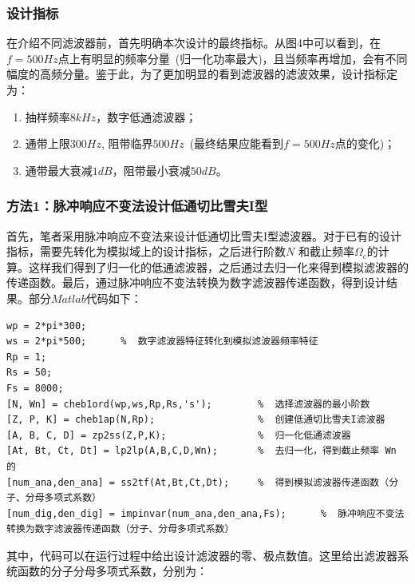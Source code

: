 \documentclass[a4paper,11pt,onecolumn,twoside]{article}
\begin{document}
\subsubsection{设计指标}
在介绍不同滤波器前，首先明确本次设计的最终指标。从图4中可以看到，在$f=500Hz$点上有明显的频率分量~(归一化功率最大)，且当频率再增加，会有不同幅度的高频分量。鉴于此，为了更加明显的看到滤波器的滤波效果，设计指标定为：
\begin{enumerate}
\item 抽样频率$8kHz$，数字低通滤波器；
\item 通带上限$300Hz$, 阻带临界$500Hz$~(最终结果应能看到$f=500Hz$点的变化)；
\item 通带最大衰减$1dB$，阻带最小衰减$50dB$。
\end{enumerate}

\subsubsection{方法1：脉冲响应不变法设计低通切比雪夫I型}
首先，笔者采用脉冲响应不变法来设计低通切比雪夫I型滤波器。对于已有的设计指标，需要先转化为模拟域上的设计指标，之后进行阶数$N$ 和截止频率$\Omega_c$的计算。这样我们得到了归一化的低通滤波器，之后通过去归一化来得到模拟滤波器的传递函数。最后，通过脉冲响应不变法转换为数字滤波器传递函数，得到设计结果。部分$Matlab$代码如下：

\begin{lstlisting}[style=Matlab-editor,
                   basicstyle=\mlttfamily,
                   caption={Designing IIR Filter Code}, label=code1]
wp = 2*pi*300;
ws = 2*pi*500;      %  数字滤波器特征转化到模拟滤波器频率特征
Rp = 1;
Rs = 50;
Fs = 8000;
[N, Wn] = cheb1ord(wp,ws,Rp,Rs,'s');        %  选择滤波器的最小阶数
[Z, P, K] = cheb1ap(N,Rp);                  %  创建低通切比雪夫I滤波器
[A, B, C, D] = zp2ss(Z,P,K);                %  归一化低通滤波器
[At, Bt, Ct, Dt] = lp2lp(A,B,C,D,Wn);       %  去归一化，得到截止频率 Wn 的
[num_ana,den_ana] = ss2tf(At,Bt,Ct,Dt);     %  得到模拟滤波器传递函数（分子、分母多项式系数）
[num_dig,den_dig] = impinvar(num_ana,den_ana,Fs);      %  脉冲响应不变法 转换为数字滤波器传递函数（分子、分母多项式系数）
\end{lstlisting}

其中，代码可以在运行过程中给出设计滤波器的零、极点数值。这里给出滤波器系统函数的分子分母多项式系数，分别为：
\end{document}

